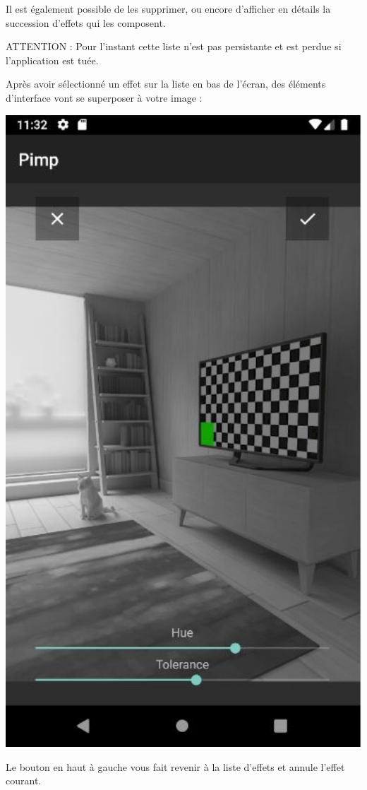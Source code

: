 \begin{center}
\begin{minipage}{.48\textwidth}
        Il est également possible de les supprimer, ou encore d'afficher en détails la succession d'effets qui les composent.

        ATTENTION : Pour l'instant cette liste n'est pas persistante et est perdue si l'application est tuée.
    \end{minipage}
\end{center}
\clearpage



Après avoir sélectionné un effet sur la liste en bas de l'écran, des éléments d'interface vont se superposer à votre image :
\begin{center}
    \begin{minipage}{.48\textwidth}
      \includegraphics[width=1\textwidth]{report_src/app_manual/effect_fragment_preview.JPG}
    \end{minipage}
    \begin{minipage}{.48\textwidth}
        Le bouton {\faRemove} en haut à gauche vous fait revenir à la liste d'effets et annule l'effet courant.
        \\


\end{minipage}
\end{center}
